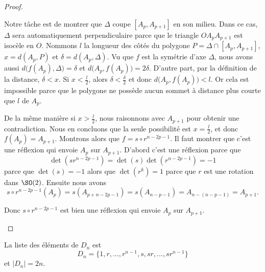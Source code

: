 \begin{proof}
\begin{enumerate}
		      Notre tâche est de montrer que \( \Delta\) coupe \( [A_p,A_{p+1}]\) en son milieu. Dans ce cas, \( \Delta\) sera automatiquement perpendiculaire parce que le triangle \( OA_pA_{p+1}\) est isocèle en \( O\). Nommons \( l\) la longueur des côtés du polygone \( P=\Delta\cap[A_p,A_{p+1}]\), \( x=d(A_p,P)\) et \( \delta=d(A_p,\Delta)\). Vu que \( f\) est la symétrie d'axe \( \Delta\), nous avons aussi \( d\big( f(A_p),\Delta \big)=\delta\) et \( d\big( A_p,f(A_p) \big)=2\delta\). D'autre part, par la définition de la distance, \( \delta<x\). Si \( x<\frac{ l }{2}\), alors \( \delta<\frac{ \delta }{2}\) et donc \( d\big( A_p,f(A_p) \big)<l\). Or cela est impossible parce que le polygone ne possède aucun sommet à distance plus courte que \( l\) de \( A_p\).

		      De la même manière si \( x>\frac{ l }{2}\), nous raisonnons avec \( A_{p+1}\) pour obtenir une contradiction. Nous en concluons que la seule possibilité est \( x=\frac{ l }{2}\), et donc \( f(A_p)=A_{p+1}\). Montrons alors que \( f=s\circ r^{n-2p-1}\). Il faut montrer que c'est une réflexion qui envoie \( A_p\) sur \( A_{p+1}\). D'abord c'est une réflexion parce que
		      \begin{equation}
			      \det(sr^{n-2p-1})=\det(s)\det(r^{n-2p-1})=-1
		      \end{equation}
		      parce que \( \det(s)=-1\) alors que \( \det(r^k)=1\) parce que \( r\) est une rotation dans \( \SO(2)\). Ensuite nous avons
		      \begin{equation}
			      s\circ r^{n-2p-1}(A_p)=s(A_{p+n-2p-1})=s(A_{n-p-1})=A_{n-(n-p-1)}=A_{p+1}.
		      \end{equation}

		      Donc \( s\circ r^{n-2p-1}\) est bien une réflexion qui envoie \( A_p\) sur \( A_{p+1}\).

	\end{enumerate}
\end{proof}

\begin{corollary}   \label{CorWYITsWW}
	La liste des éléments de \( D_n\) est
	\begin{equation}
		D_n=\{ 1,r,\ldots, r^{n-1},s,sr,\ldots, sr^{n-1} \}
	\end{equation}
	et \( | D_n |=2n\).
\end{corollary}

